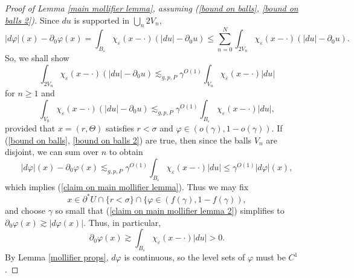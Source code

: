 \documentclass[reqno,12pt,letterpaper]{amsart}
\theoremstyle{definition}
\numberwithin{equation}{section}
\begin{document}
\begin{proof}[Proof of Lemma \ref{main mollifier lemma}, assuming (\ref{bound on balls}, \ref{bound on balls 2})]
Since $du$ is supported in $\bigcup_n 2V_n$,
$$|d\varphi|(x) - \partial_0\varphi(x) = \int_{B_\varepsilon} \chi_\varepsilon(x - \cdot)(|du| - \partial_0 u) \leq \sum_{n=0}^N \int_{2V_n} \chi_\varepsilon(x - \cdot)(|du| - \partial_0 u).$$
So, we shall show
\begin{equation}\label{bound on balls}
\int_{2V_n} \chi_\varepsilon(x - \cdot)(|du| - \partial_0u) \lesssim_{g, p, P} \gamma^{O(1)} \int_{V_n} \chi_\varepsilon(x - \cdot)|du|
\end{equation}
for $n \geq 1$ and
\begin{equation}\label{bound on balls 2}
\int_{V_0} \chi_\varepsilon(x - \cdot)(|du| - \partial_0u) \lesssim_{g, p, P} \gamma^{O(1)} \int_{B_\varepsilon} \chi_\varepsilon(x - \cdot)|du|,
\end{equation}
provided that $x = (r, \Theta)$ satisfies $r < \sigma$ and $\varphi \in (o(\gamma), 1 - o(\gamma))$.
If (\ref{bound on balls}, \ref{bound on balls 2}) are true, then since the balls $V_n$ are disjoint, we can sum over $n$ to obtain
\begin{equation}\label{claim on main mollifier lemma 2}|d\varphi|(x) - \partial_0\varphi(x) \lesssim_{g, p, P} \gamma^{O(1)} \int_{B_\varepsilon} \chi_\varepsilon(x - \cdot)|du| \leq \gamma^{O(1)} |d\varphi|(x),
\end{equation}
which implies (\ref{claim on main mollifier lemma}). Thus we may fix
$$x \in \partial^* U \cap \{r < \sigma\} \cap \{\varphi \in (f(\gamma), 1 - f(\gamma)),$$
and choose $\gamma$ so small that (\ref{claim on main mollifier lemma 2}) simplifies to $\partial_0 \varphi(x) \gtrsim |d\varphi(x)|$.
Thus, in particular,
$$\partial_0 \varphi(x) \gtrsim \int_{B_\varepsilon} \chi_\varepsilon(x - \cdot) |du| > 0.$$
By Lemma \ref{mollifier props}, $d\varphi$ is continuous, so the level sets of $\varphi$ must be $C^1$.
\end{proof}
\end{document}
